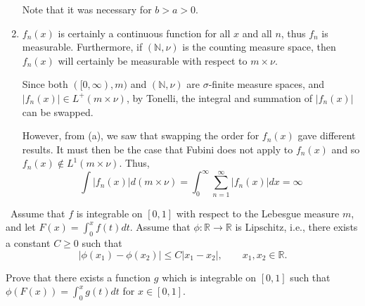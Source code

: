 \documentclass[12pt]{Homework}
\begin{document}
\begin{solution}
\begin{enumerate}[label=(\alph*)]
   Note that it was necessary for $b>a>0$.
    \item $f_n(x)$ is certainly a continuous function for all $x$ and all $n$, thus $f_n$ is measurable. Furthermore, if $(\mathbb{N},\nu)$ is the counting measure space, then $f_n(x)$ will certainly be measurable with respect to $m\times\nu$. 
    
    Since both $([0,\infty),m)$ and $(\mathbb{N},\nu)$ are $\sigma$-finite measure spaces, and $|f_n(x)|\in L^+(m\times\nu)$, by Tonelli, the integral and summation of $|f_n(x)|$ can be swapped. 
    
    However, from (a), we saw that swapping the order for $f_n(x)$ gave different results. It must then be the case that Fubini does not apply to $f_n(x)$ and so $f_n(x)\notin L^1(m\times \nu)$. Thus, $$\int|f_n(x)|d(m\times\nu)=\int_0^\infty\sum_{n=1}^\infty|f_n(x)|dx=\infty$$
\end{enumerate}
\end{solution}
\newpage

\begin{problem} $\,$
Assume that $f$ is integrable on $[0,1]$ with respect to the Lebesgue measure $m$, and let $F(x)=\int_0^xf(t)dt.$ Assume that $\phi:\mathbb{R}\to\mathbb{R}$ is Lipschitz, i.e., there exists a constant $C\ge0$ such that $$|\phi(x_1)-\phi(x_2)|\le C|x_1-x_2|,\qquad x_1,x_2\in\mathbb{R}.$$

Prove that there exists a function $g$ which is integrable on $[0,1]$ such that $\phi(F(x))=\int_0^xg(t)dt$ for $x\in[0,1]$.
\end{problem}
\end{document}
